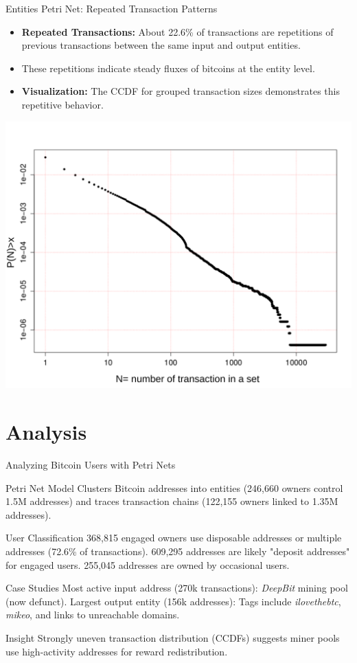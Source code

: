 \documentclass{beamer}
\begin{document}
\begin{frame}{Entities Petri Net: Repeated Transaction Patterns}
    \footnotesize
    \begin{itemize}
        \item \textbf{Repeated Transactions:} About 22.6\% of transactions are repetitions of previous transactions between the same input and output entities.
        \item These repetitions indicate steady fluxes of bitcoins at the entity level.
        \item \textbf{Visualization:} The CCDF for grouped transaction sizes demonstrates this repetitive behavior.
    \end{itemize}
    \vspace{-0.1cm}
    \centering
    \includegraphics[width=0.5\linewidth]{groupTE}
    \label{fig_transE_CCDF}
\end{frame}

\section{Analysis}
\begin{frame}{Analyzing Bitcoin Users with Petri Nets}
    \footnotesize
    \begin{block}{Petri Net Model}
        Clusters Bitcoin addresses into entities (246,660 owners control 1.5M addresses) and traces transaction chains (122,155 owners linked to 1.35M addresses).
    \end{block}

    \begin{block}{User Classification}
        368,815 engaged owners use disposable addresses or multiple addresses (72.6\% of transactions). 609,295 addresses are likely "deposit addresses" for engaged users.        255,045 addresses are owned by occasional users.
    \end{block}

    \begin{block}{Case Studies}
        Most active input address (270k transactions): \textit{DeepBit} mining pool (now defunct).
        Largest output entity (156k addresses): Tags include \textit{ilovethebtc}, \textit{mikeo}, and links to unreachable domains.
    \end{block}

    \begin{block}{Insight}
        Strongly uneven transaction distribution (CCDFs) suggests miner pools use high-activity addresses for reward redistribution.
    \end{block}
\end{frame}
\end{document}

